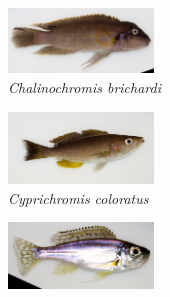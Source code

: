
\newcommand{\fishfigwidth}{1.52in}

\begin{figure}
    \centering
    \begin{subfigure}[t]{\fishfigwidth}
        \includegraphics[width=\fishfigwidth]{figures/host_phenotypes/Chalinochromis_brichardi}
        \small
        \caption{\textit{Chalinochromis brichardi}}
    \end{subfigure}
    \begin{subfigure}[t]{\fishfigwidth}
        \includegraphics[width=\fishfigwidth]{figures/host_phenotypes/Cyprichromis_coloratus}
        \small
        \caption{\textit{Cyprichromis coloratus}}
    \end{subfigure}
    \begin{subfigure}[t]{\fishfigwidth}
        \includegraphics[width=\fishfigwidth]{figures/host_phenotypes/Haplotaxodon_microlepis}

\end{subfigure}
\end{figure}
